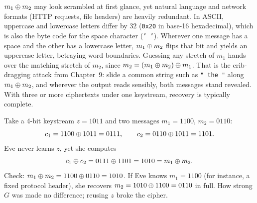 \begin{intuitionbox}
$m_1 \oplus m_2$ may look scrambled at first glance, yet natural language and network formats (HTTP requests, file headers) are heavily redundant. In ASCII, uppercase and lowercase letters differ by $32$ (\texttt{0x20} in base-16 hexadecimal), which is also the byte code for the space character (\texttt{' '}). Wherever one message has a space and the other has a lowercase letter, $m_1 \oplus m_2$ flips that bit and yields an uppercase letter, betraying word boundaries. Guessing any stretch of $m_1$ hands over the matching stretch of $m_2$, since $m_2 = (m_1 \oplus m_2) \oplus m_1$. That is the crib-dragging attack from Chapter~9: slide a common string such as \texttt{" the "} along $m_1 \oplus m_2$, and wherever the output reads sensibly, both messages stand revealed. With three or more ciphertexts under one keystream, recovery is typically complete.
\end{intuitionbox}

\begin{example}
\label{ch10:ex-twotime}
Take a 4-bit keystream $z = 1011$ and two messages $m_1 = 1100$, $m_2 = 0110$:
\[
  c_1 = 1100 \oplus 1011 = 0111, \qquad c_2 = 0110 \oplus 1011 = 1101.
\]
Eve never learns $z$, yet she computes
\[
  c_1 \oplus c_2 = 0111 \oplus 1101 = 1010 = m_1 \oplus m_2 .
\]
Check: $m_1 \oplus m_2 = 1100 \oplus 0110 = 1010$. If Eve knows $m_1 = 1100$ (for instance, a fixed protocol header), she recovers $m_2 = 1010 \oplus 1100 = 0110$ in full. How strong $G$ was made no difference; reusing $z$ broke the cipher.
\end{example}

